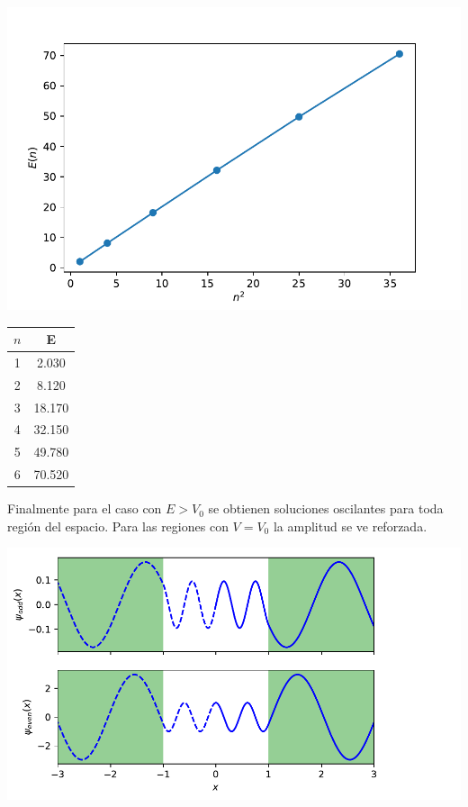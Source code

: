 \documentclass[paper=letter, fontsize=11pt]{scrartcl}
\begin{document}
\begin{center}
	\includegraphics[width=0.5\linewidth]{energy.pdf}
\end{center}
\begin{table}[h]
	\centering
	\begin{tabular}{cc}
		\hline
		$n$ & E \\
		\hline
		1 & 2.030 \\
		2 & 8.120 \\
		3 & 18.170 \\
		4 & 32.150 \\
		5 & 49.780 \\
		6 & 70.520 \\
		\hline
	\end{tabular}
\end{table}

Finalmente para el caso con $E > V_0$ se obtienen soluciones oscilantes para toda regi\'on del espacio. Para las regiones con $V = V_0$ la amplitud se ve reforzada.
\begin{center}
	\includegraphics[width=\linewidth]{greater.pdf}
\end{center}
\end{document}

